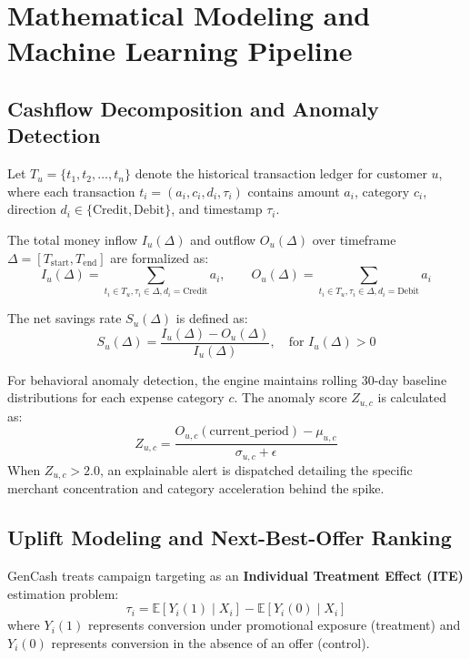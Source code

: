 \documentclass[10.5pt,a4paper]{article}
\begin{document}
\section{Mathematical Modeling and Machine Learning Pipeline}

\subsection{Cashflow Decomposition and Anomaly Detection}
Let $T_u = \{t_1, t_2, \dots, t_n\}$ denote the historical transaction ledger for customer $u$, where each transaction $t_i = (a_i, c_i, d_i, \tau_i)$ contains amount $a_i$, category $c_i$, direction $d_i \in \{\text{Credit}, \text{Debit}\}$, and timestamp $\tau_i$.

The total money inflow $I_u(\Delta)$ and outflow $O_u(\Delta)$ over timeframe $\Delta = [T_{\text{start}}, T_{\text{end}}]$ are formalized as:
\begin{equation}
I_u(\Delta) = \sum_{t_i \in T_u, \tau_i \in \Delta, d_i = \text{Credit}} a_i, \qquad O_u(\Delta) = \sum_{t_i \in T_u, \tau_i \in \Delta, d_i = \text{Debit}} a_i
\end{equation}

The net savings rate $S_u(\Delta)$ is defined as:
\begin{equation}
S_u(\Delta) = \frac{I_u(\Delta) - O_u(\Delta)}{I_u(\Delta)}, \quad \text{for } I_u(\Delta) > 0
\end{equation}

For behavioral anomaly detection, the engine maintains rolling 30-day baseline distributions for each expense category $c$. The anomaly score $Z_{u,c}$ is calculated as:
\begin{equation}
Z_{u,c} = \frac{O_{u,c}(\text{current\_period}) - \mu_{u,c}}{\sigma_{u,c} + \epsilon}
\end{equation}
When $Z_{u,c} > 2.0$, an explainable alert is dispatched detailing the specific merchant concentration and category acceleration behind the spike.

\subsection{Uplift Modeling and Next-Best-Offer Ranking}
GenCash treats campaign targeting as an \textbf{Individual Treatment Effect (ITE)} estimation problem:
\begin{equation}
\tau_i = \mathbb{E}[Y_i(1) \mid X_i] - \mathbb{E}[Y_i(0) \mid X_i]
\end{equation}
where $Y_i(1)$ represents conversion under promotional exposure (treatment) and $Y_i(0)$ represents conversion in the absence of an offer (control).
\end{document}
